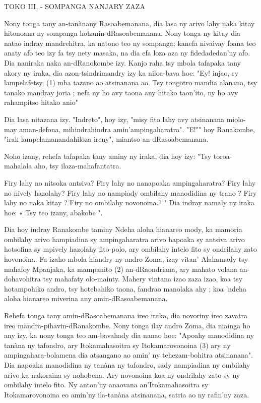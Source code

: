 TOKO III, - SOMPANGA NANJARY ZAZA

Nony tonga tany an-tanànany Rasoabemanana, dia lasa ny arivo lahy
naka kitay hitonoana ny sompanga hohanin-dRasoabemanana. Nony tonga
ny kitay dia natao indray mandrehitra, ka natono teo ny sompanga; kanefa
nivaivay foana teo anaty afo teo izy fa tsy nety masaka, na dia efa loza
aza ny fidedadedan'ny afo. Dia naniraka naka an-dRanokombe izy. Kanjo
raha tsy mbola tafapaka tany akory ny iraka, dia azon-tsindrimandry izy
ka niloa-bava hoe: "Ey! injao, ry lampelafetsy, (1) mba tazano ao atsinanana ao. 
Tsy tongotro mandia alanana, tsy tanako mandray joria ; nefa ny
ho avy taona any hitako taon'ito, ny ho avy rahampitso hitako anio"

Dia lasa nitazana izy. "Indreto", hoy izy, "misy fito lahy avy
atsinanana miolo-may aman-defona, mihindrahindra amin'ampingaharatra". 
"E!"" hoy Ranakombe, "irak lampelamanandahiloza ireny", miantso an-dRasoabemanana.

Noho izany, rehefa tafapaka tany aminy ny iraka, dia hoy izy: "Tsy
toroa-mahalala aho, tsy ilaza-mahafantatra.

Firy lahy no nitsoka antsiva?
Firy lahy no nanapoaka ampingaharatra? 
Firy lahy no nively hazolahy?
Firy lahy no nampiady ombilahy manodidina ny trano ? 
Firy lahy no naka kitay ?
Firy no ombilahy novonoina.? "
Dia indray namaly ny iraka hoe:
« Tsy teo izany, abakobe ".

Dia hoy indray Ranakombe taminy Ndeha aloha hianareo mody,
ka mamoria ombilahy arivo hampiadina sy ampingaharatra arivo hapoaka
sy antsiva arivo hotsofina sy mpively hazolahy fito-polo, ary ombilahy
intelo fito sy ondrilahy zato hovonoina. Fa izaho mbola hiandry ny andro
Zoma, izay vitan' Alahamady tsy mahafoy Mpanjaka, ka mampanito (2)
an-dRaondriana, ary mahato volana an-dohavohitra tsy mahafaty olo-mainty. 
Mahery vintana izao zaza izao, koa tsy hotampohiko andro, tsy
hotebahiko taona, fandrao manolaka ahy ; koa 'ndeha aloha hianareo
miverina any amin-dRasoabemanana.

Rehefa tonga tany amin-dRasoabemanana ireo iraka, dia novoriny
ireo zavatra ireo mandra-pihavin-dRanakombe. Nony tonga ilay andro
Zoma, dia niainga ho any izy, ka nony tonga teo am-bavahady dia nanao
hoe: "Apoahy manodidina ny tanàna ny tafondro, ary Itokamahasoitra
sy Itokamarovonoina (3) ary ny ampingahara-bolamena dia atsangano
ao amin' ny tehezam-bohitra atsinanana". Dia napoaka manodidina ny
tanàna ny tafondro, sady nampiadina ny ombilahy arivo ka nakoraina
sy nohobena. Ary novonoina koa ny ondrilahy zato sy ny ombilahy intelo
fito. Ny anton'ny anaovana an'Itokamahasoitra sy Itokamarovonoina eo
amin'ny ila-tanàna atsinanana, satria ao ny rafin'ny zaza.

